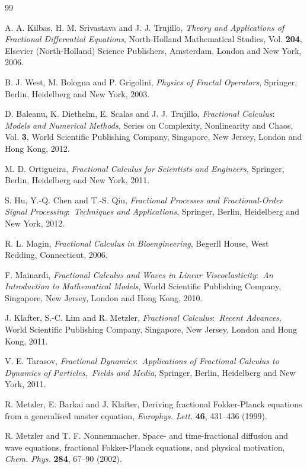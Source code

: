 \documentclass[10pt]{NSP1}
\begin{document}
\begin{thebibliography}{99}

A. A. Kilbas, H. M. Srivastava and J. J. Trujillo,
\textit{Theory and Applications of Fractional Differential Equations},
North-Holland Mathematical Studies,
Vol. \textbf{204}, Elsevier (North-Holland) Science
Publishers, Amsterdam, London and New York, 2006.

B. J. West, M. Bologna and P. Grigolini, {\it Physics of Fractal Operators},
Springer, Berlin, Heidelberg and New York, 2003.

D. Baleanu, K. Diethelm, E. Scalas and J. J. Trujillo, \textit{Fractional
Calculus$:$ Models and Numerical Methods}, Series on Complexity,
Nonlinearity and Chaos, Vol. {\bf 3}, World Scientific
Publishing Company, Singapore, New Jersey, London and Hong Kong, 2012.

M. D. Ortigueira, \textit{Fractional Calculus for Scientists and Engineers},
Springer, Berlin, Heidelberg and New York, 2011.

S. Hu, Y.-Q. Chen and T.-S. Qiu, {\it Fractional Processes
and Fractional-Order Signal Processing$:$
Techniques and Applications}, Springer, Berlin, Heidelberg and New York, 2012.

R. L. Magin, {\it Fractional Calculus in Bioengineering}, Begerll House,
West Redding, Connecticut, 2006.

F. Mainardi, \textit{Fractional Calculus and Waves in Linear Viscoelasticity$:$
An Introduction to Mathematical Models}, World Scientific Publishing Company,
Singapore, New Jersey, London and Hong Kong, 2010.

J. Klafter, S.-C. Lim and R. Metzler, \textit{Fractional Calculus$:$ Recent
Advances}, World Scientific Publishing Company,
Singapore, New Jersey, London and Hong Kong, 2011.

V. E. Tarasov, {\it Fractional Dynamics$:$ Applications of Fractional
Calculus to Dynamics of Particles$,$
Fields and Media}, Springer, Berlin, Heidelberg and New York, 2011.

R. Metzler, E. Barkai and J. Klafter, Deriving fractional Fokker-Planck
equations from a generalised
master equation, {\it Europhys. Lett.} {\bf 46}, 431--436 (1999).

R. Metzler and T. F. Nonnenmacher, Space- and
time-fractional diffusion and wave equations,
fractional Fokker-Planck equations, and physical motivation,
{\it Chem. Phys.} {\bf 284}, 67--90 (2002).


\end{thebibliography}
\end{document}
